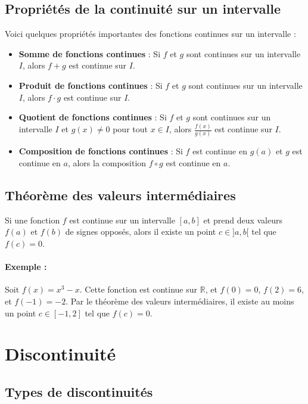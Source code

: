 \documentclass{article}
\begin{document}
	\subsection{Propriétés de la continuité sur un intervalle}
	
	Voici quelques propriétés importantes des fonctions continues sur un intervalle :
	\begin{itemize}
		\item \textbf{Somme de fonctions continues} : Si \( f \) et \( g \) sont continues sur un intervalle \( I \), alors \( f + g \) est continue sur \( I \).
		\item \textbf{Produit de fonctions continues} : Si \( f \) et \( g \) sont continues sur un intervalle \( I \), alors \( f \cdot g \) est continue sur \( I \).
		\item \textbf{Quotient de fonctions continues} : Si \( f \) et \( g \) sont continues sur un intervalle \( I \) et \( g(x) \neq 0 \) pour tout \( x \in I \), alors \( \frac{f(x)}{g(x)} \) est continue sur \( I \).
		\item \textbf{Composition de fonctions continues} : Si \( f \) est continue en \( g(a) \) et \( g \) est continue en \( a \), alors la composition \( f \circ g \) est continue en \( a \).
	\end{itemize}
	
	\subsection{Théorème des valeurs intermédiaires}
	
	Si une fonction \( f \) est continue sur un intervalle \( [a, b] \) et prend deux valeurs \( f(a) \) et \( f(b) \) de signes opposés, alors il existe un point \( c \in ]a, b[ \) tel que \( f(c) = 0 \).
	
	\paragraph{Exemple :} Soit \( f(x) = x^3 - x \). Cette fonction est continue sur \( \mathbb{R} \), et \( f(0) = 0 \), \( f(2) = 6 \), et \( f(-1) = -2 \). Par le théorème des valeurs intermédiaires, il existe au moins un point \( c \in [-1, 2] \) tel que \( f(c) = 0 \).
	
	\section{Discontinuité}
	
	\subsection{Types de discontinuités}
	
\end{document}
